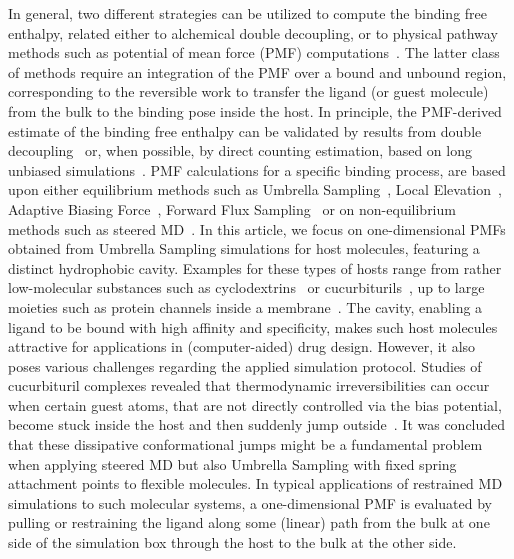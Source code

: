 \documentclass[9pt,lessons]{livecoms}
\begin{document}
In general, two different strategies can be utilized to compute the binding free enthalpy, related either to alchemical double decoupling, or to physical pathway methods such as potential of mean force (PMF) computations~\cite{deng2009computations}.
The latter class of methods require an integration of the PMF over a bound and unbound region, corresponding to the reversible work to transfer the ligand (or guest molecule) from the bulk to the binding pose inside the host.
In principle, the PMF-derived estimate of the binding free enthalpy can be validated by results from double decoupling~\cite{markthaler2017molecular, gumbart2012standard} or, when possible, 
by direct counting estimation, based on long unbiased simulations~\cite{pan2017quantitative, baz2018insights}.
PMF calculations for a specific binding process, are based upon either equilibrium methods such as Umbrella Sampling~\cite{torrie1974monte, torrie1977nonphysical}, Local Elevation~\cite{huber1994local}, 
Adaptive Biasing Force~\cite{darve2008adaptive}, Forward Flux Sampling~\cite{allen2009forward} or on non-equilibrium methods such as steered MD~\cite{isralewitz2001steered_1}.
In this article, we focus on one-dimensional PMFs obtained from Umbrella Sampling simulations for host molecules, featuring a distinct hydrophobic cavity.
Examples for these types of hosts range from rather low-molecular substances such as cyclodextrins~\cite{del2004cyclodextrins} or cucurbiturils~\cite{velez2012force, velez2013overcoming}, 
up to large moieties such as protein channels inside a membrane~\cite{allen2006ion, allen2006molecular, hub2010g_wham, flood2019atomistic}.
The cavity, enabling a ligand to be bound with high affinity and specificity, makes such host molecules attractive for applications in (computer-aided) drug design.
However, it also poses various challenges regarding the applied simulation protocol.
Studies of cucurbituril complexes revealed that thermodynamic irreversibilities can occur when certain guest atoms, that are not directly controlled via the bias potential, become stuck inside the host and then suddenly jump outside~\cite{velez2012force, velez2013overcoming}.
It was concluded that these dissipative conformational jumps might be a fundamental problem when applying steered MD but also Umbrella Sampling with fixed spring attachment points to flexible molecules.
In typical applications of restrained MD simulations to such molecular systems, a one-dimensional PMF is evaluated by pulling or restraining the ligand along some (linear) path from the bulk at one side of the simulation 
box through the host to the bulk at the other side.
\end{document}
